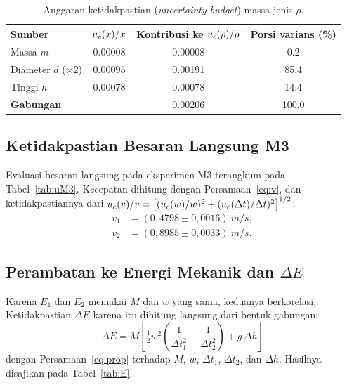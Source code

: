 \documentclass[a4paper, 12pt]{article}
\begin{document}
\begin{table}[H]
\centering
\singlespacing
\caption{Anggaran ketidakpastian (\textit{uncertainty budget}) massa jenis $\rho$.}
\label{tab:budget}
\small
\begin{tabular}{l S[table-format=1.5] S[table-format=1.5] S[table-format=3.1]}
\toprule
\textbf{Sumber} & {$u_{c}(x)/x$} & {Kontribusi ke $u_{c}(\rho)/\rho$} & {Porsi varians (\%)}\\
\midrule
Massa $m$ & 0.00008 & 0.00008 & 0.2\\
Diameter $d$ ($\times2$) & 0.00095 & 0.00191 & 85.4\\
Tinggi $h$ & 0.00078 & 0.00078 & 14.4\\
\midrule
\textbf{Gabungan} & & 0.00206 & 100.0\\
\bottomrule
\end{tabular}
\end{table}

\subsection{Ketidakpastian Besaran Langsung M3}
        Evaluasi besaran langsung pada eksperimen M3 terangkum pada Tabel~\ref{tab:uM3}. Kecepatan dihitung dengan Persamaan~\eqref{eq:v}, dan ketidakpastiannya dari $u_{c}(v)/v = \bigl[(u_{c}(w)/w)^2 + (u_{c}(\Delta t)/\Delta t)^2\bigr]^{1/2}$:
        \begin{align*}
            v_1 &= (0{,}4798\pm0{,}0016)\ \si{m/s},\\
            v_2 &= (0{,}8985\pm0{,}0033)\ \si{m/s}.
        \end{align*}

        \subsection{Perambatan ke Energi Mekanik dan \texorpdfstring{$\Delta E$}{Delta E}}
        Karena $E_1$ dan $E_2$ memakai $M$ dan $w$ yang sama, keduanya berkorelasi. Ketidakpastian $\Delta E$ karena itu dihitung langsung dari bentuk gabungan:
        \begin{equation}
            \Delta E=M\left[\tfrac{1}{2}w^{2}\left(\frac{1}{\Delta t_1^{2}}-\frac{1}{\Delta t_2^{2}}\right)+g\,\Delta h\right]
            \label{eq:dEfull}
        \end{equation}
        dengan Persamaan~\eqref{eq:prop} terhadap $M$, $w$, $\Delta t_1$, $\Delta t_2$, dan $\Delta h$. Hasilnya disajikan pada Tabel~\ref{tab:E}.
\end{document}
